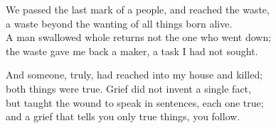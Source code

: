 \begin{founder}
We passed the last mark of a people, and reached the waste,\\
a waste beyond the wanting of all things born alive.\\
A man swallowed whole returns not the one who went down;\\
the waste gave me back a maker, a task I had not sought.\\
\medskip

And someone, truly, had reached into my house and killed;\\
both things were true. Grief did not invent a single fact,\\
but taught the wound to speak in sentences, each one true;\\
and a grief that tells you only true things, you follow.\\

\ornament


\end{founder}
